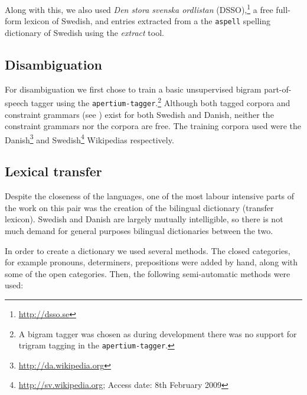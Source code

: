 \documentclass[11pt]{article}
\begin{document}
Along with this, we also used \emph{Den stora svenska ordlistan} (DSSO),\footnote{\url{http://dsso.se}} 
a free full-form lexicon of Swedish, and entries extracted from a the {\tt\small aspell} spelling
dictionary of Swedish using the \emph{extract} tool.

\subsection{Disambiguation}


For disambiguation we first chose to train a basic unsupervised bigram part-of-speech tagger
using the {\tt\small apertium-tagger}.\footnote{A bigram tagger was chosen as during development
there was no support for trigram tagging in the {\tt\small apertium-tagger}.} Although both tagged corpora and constraint
grammars (see \citet{karlsson1995}) exist for both Swedish and Danish, neither the constraint grammars
nor the corpora are free. The training corpora used were the 
Danish\footnote{\url{http://da.wikipedia.org}} and Swedish\footnote{\url{http://sv.wikipedia.org}; 
Access date: 8th February 2009} Wikipedias respectively.


\subsection{Lexical transfer}

Despite the closeness of the languages, one of the most labour intensive parts of 
the work on this pair was the creation of the bilingual dictionary (transfer 
lexicon). Swedish and Danish are largely mutually intelligible, so there is not 
much demand for general purposes bilingual dictionaries between the two.

In order to create a dictionary we used several methods. The closed categories, 
for example pronouns, determiners, prepositions were added by hand, along with some 
of the open categories. Then, the following semi-automatic methods were used:
\end{document}
